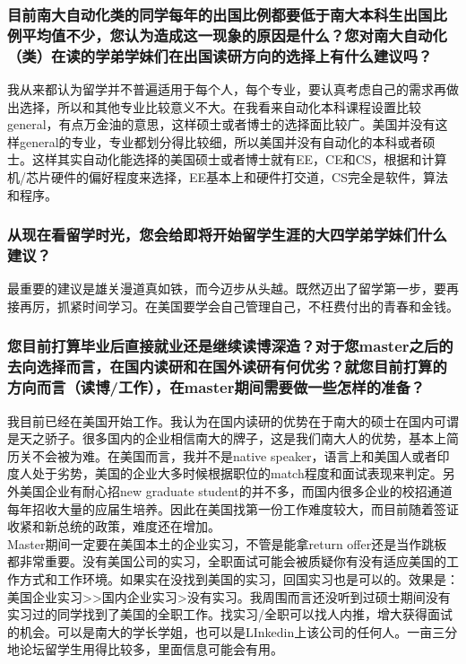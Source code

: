 \documentclass[a4paper,UTF8]{book}
\begin{document}
    \subsubsection*{目前南大自动化类的同学每年的出国比例都要低于南大本科生出国比例平均值不少，您认为造成这一现象的原因是什么？您对南大自动化（类）在读的学弟学妹们在出国读研方向的选择上有什么建议吗？}
    我从来都认为留学并不普遍适用于每个人，每个专业，要认真考虑自己的需求再做出选择，所以和其他专业比较意义不大。在我看来自动化本科课程设置比较general，有点万金油的意思，这样硕士或者博士的选择面比较广。美国并没有这样general的专业，专业都划分得比较细，所以美国并没有自动化的本科或者硕士。这样其实自动化能选择的美国硕士或者博士就有EE，CE和CS，根据和计算机/芯片硬件的偏好程度来选择，EE基本上和硬件打交道，CS完全是软件，算法和程序。

    \subsubsection*{从现在看留学时光，您会给即将开始留学生涯的大四学弟学妹们什么建议？}
    最重要的建议是雄关漫道真如铁，而今迈步从头越。既然迈出了留学第一步，要再接再厉，抓紧时间学习。在美国要学会自己管理自己，不枉费付出的青春和金钱。

    \subsubsection*{您目前打算毕业后直接就业还是继续读博深造？对于您master之后的去向选择而言，在国内读研和在国外读研有何优劣？就您目前打算的方向而言（读博/工作），在master期间需要做一些怎样的准备？}
    我目前已经在美国开始工作。我认为在国内读研的优势在于南大的硕士在国内可谓是天之骄子。很多国内的企业相信南大的牌子，这是我们南大人的优势，基本上简历关不会被为难。在美国而言，我并不是native speaker，语言上和美国人或者印度人处于劣势，美国的企业大多时候根据职位的match程度和面试表现来判定。另外美国企业有耐心招new graduate student的并不多，而国内很多企业的校招通道每年招收大量的应届生培养。因此在美国找第一份工作难度较大，而目前随着签证收紧和新总统的政策，难度还在增加。\\
    Master期间一定要在美国本土的企业实习，不管是能拿return offer还是当作跳板都非常重要。没有美国公司的实习，全职面试可能会被质疑你有没有适应美国的工作方式和工作环境。如果实在没找到美国的实习，回国实习也是可以的。效果是：美国企业实习>>国内企业实习>没有实习。我周围而言还没听到过硕士期间没有实习过的同学找到了美国的全职工作。找实习/全职可以找人内推，增大获得面试的机会。可以是南大的学长学姐，也可以是LInkedin上该公司的任何人。一亩三分地论坛留学生用得比较多，里面信息可能会有用。
\end{document}
